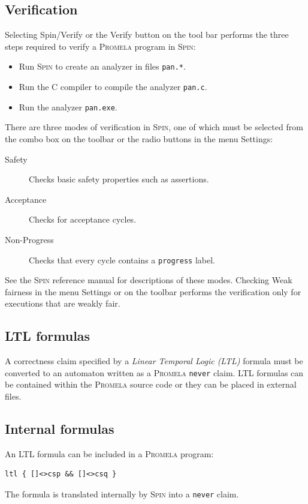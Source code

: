 \documentclass[11pt]{article}
\newcommand{\spn}{\textsc{Spin}}
\newcommand{\prm}{\textsc{Promela}}
\newcommand{\p}[1]{\texttt{#1}}
\newcommand{\bu}[1]{\textsf{#1}}
\begin{document}
\subsection{Verification}
Selecting \bu{Spin/Verify} or the \bu{Verify} button on the tool bar
performs the three steps required to verify a \prm{} program in \spn{}:
\begin{itemize}
\item Run \spn{} to create an analyzer in files \p{pan.*}.
\item Run the C compiler to compile the analyzer \p{pan.c}.
\item Run the analyzer \p{pan.exe}.
\end{itemize}
There are three modes of verification in \spn{},
one of which must be selected from the combo box on the toolbar
or the radio buttons in the menu \bu{Settings}:
\begin{description}
\item[Safety] Checks basic safety properties such as assertions.
\item[Acceptance] Checks for acceptance cycles.
\item[Non-Progress] Checks that every cycle contains a
\p{progress} label.
\end{description}
See the \spn{} reference manual for descriptions of these modes.
Checking \bu{Weak fairness} in the menu \bu{Settings}
or on the toolbar performs the verification only for executions that are
weakly fair.

\subsection{LTL formulas}\label{s.ltl}

A correctness claim specified by a \emph{Linear Temporal Logic (LTL)}
formula must be converted to an automaton written as a \prm{} \p{never}
claim. LTL formulas can be contained within the \prm{} source code or
they can be placed in external files.

\subsection{Internal formulas}

An LTL formula can be included in a \prm{} program:
\begin{verbatim}
ltl { []<>csp && []<>csq }
\end{verbatim}
The formula is translated internally by \spn{} into a \p{never} claim.
\end{document}
